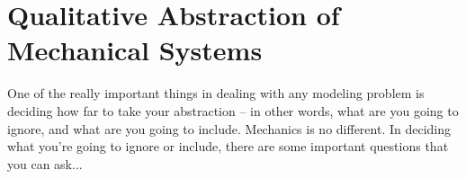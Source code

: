 \documentclass{tufte-handout}
\begin{document}
\section{Qualitative Abstraction of Mechanical Systems}
One of the really important things in dealing with any modeling problem is deciding how far to take your abstraction -- in other words, what are you going to ignore, and what are you going to include.  Mechanics is no different.   In deciding what you're going to ignore or include, there are some important questions that you can ask...
% 
%
\end{document}
